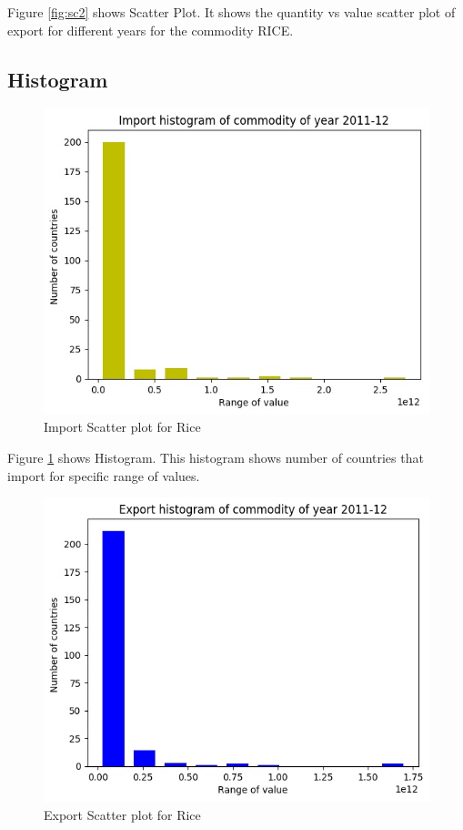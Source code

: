 \documentclass[a4paper,11pt]{article}
\begin{document}
Figure \ref{fig:sc2} shows Scatter Plot. It shows the quantity vs value scatter plot of export for different years for the commodity RICE.


\subsection{Histogram}
\begin{figure}[H]
\centering
\includegraphics[scale=0.80,width=\textwidth]{image9.jpg}
  \caption{Import Scatter plot for Rice}
  \label{fig:his1}
  
\end{figure}

Figure \ref{fig:his1} shows Histogram. This histogram shows number of countries that import for specific range of values.


\begin{figure}[H]
\centering
\includegraphics[scale=0.80,width=\textwidth]{image10.jpg}
  \caption{Export Scatter plot for Rice}
  \label{fig:his2}
  
\end{figure}
\end{document}
